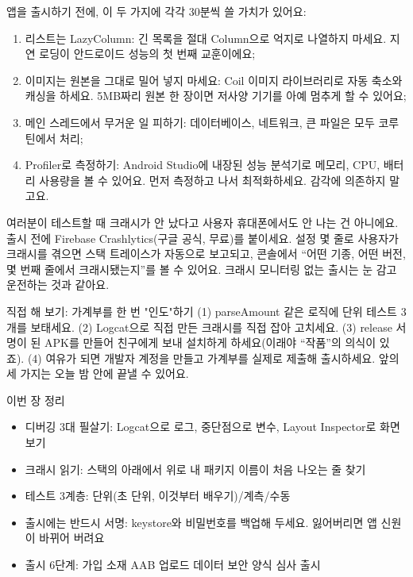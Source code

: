 
앱을 출시하기 전에, 이 두 가지에 각각 30분씩 쓸 가치가 있어요:


\begin{enumerate}
  \item 리스트는 LazyColumn: 긴 목록을 절대 Column으로 억지로 나열하지 마세요. 지연 로딩이 안드로이드 성능의 첫 번째 교훈이에요;
  \item 이미지는 원본을 그대로 밀어 넣지 마세요: Coil 이미지 라이브러리로 자동 축소와 캐싱을 하세요. 5MB짜리 원본 한 장이면 저사양 기기를 아예 멈추게 할 수 있어요;
  \item 메인 스레드에서 무거운 일 피하기: 데이터베이스, 네트워크, 큰 파일은 모두 코루틴에서 처리;
  \item Profiler로 측정하기: Android Studio에 내장된 성능 분석기로 메모리, CPU, 배터리 사용량을 볼 수 있어요. 먼저 측정하고 나서 최적화하세요. 감각에 의존하지 말고요.
\end{enumerate}


여러분이 테스트할 때 크래시가 안 났다고 사용자 휴대폰에서도 안 나는 건 아니에요. 출시 전에 Firebase Crashlytics(구글 공식, 무료)를 붙이세요. 설정 몇 줄로 사용자가 크래시를 겪으면 스택 트레이스가 자동으로 보고되고, 콘솔에서 “어떤 기종, 어떤 버전, 몇 번째 줄에서 크래시됐는지”를 볼 수 있어요. 크래시 모니터링 없는 출시는 눈 감고 운전하는 것과 같아요.

\begin{tcbpractice}{직접 해 보기: 가계부를 한 번 "인도"하기}
(1) parseAmount 같은 로직에 단위 테스트 3개를 보태세요. (2) Logcat으로 직접 만든 크래시를 직접 잡아 고치세요. (3) release 서명이 된 APK를 만들어 친구에게 보내 설치하게 하세요(이래야 “작품”의 의식이 있죠). (4) 여유가 되면 개발자 계정을 만들고 가계부를 실제로 제출해 출시하세요. 앞의 세 가지는 오늘 밤 안에 끝낼 수 있어요.

\end{tcbpractice}

\begin{tcbsummary}{이번 장 정리}
\begin{itemize}
  \item 디버깅 3대 필살기: Logcat으로 로그, 중단점으로 변수, Layout Inspector로 화면 보기
  \item 크래시 읽기: 스택의 아래에서 위로 내 패키지 이름이 처음 나오는 줄 찾기
  \item 테스트 3계층: 단위(초 단위, 이것부터 배우기)/계측/수동
  \item 출시에는 반드시 서명: keystore와 비밀번호를 백업해 두세요. 잃어버리면 앱 신원이 바뀌어 버려요
  \item 출시 6단계: 가입 소재 AAB 업로드 데이터 보안 양식 심사 출시
\end{itemize}

\end{tcbsummary}
